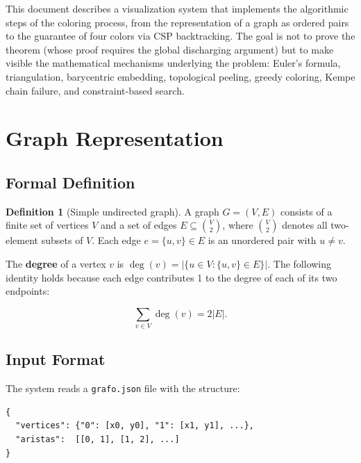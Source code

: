 \documentclass[12pt,letterpaper]{article}
\theoremstyle{plain}
\theoremstyle{definition}
\newtheorem{definition}[theorem]{Definition}
\theoremstyle{remark}
\newcommand{\degr}{\operatorname{deg}}
\begin{document}
This document describes a visualization system that implements the algorithmic
steps of the coloring process, from the representation of a graph as ordered
pairs to the guarantee of four colors via CSP backtracking. The goal is not to
prove the theorem (whose proof requires the global discharging argument) but to
make visible the mathematical mechanisms underlying the problem: Euler's formula,
triangulation, barycentric embedding, topological peeling, greedy coloring,
Kempe chain failure, and constraint-based search.

\section{Graph Representation}

\subsection{Formal Definition}

\begin{definition}[Simple undirected graph]
A graph $G = (V, E)$ consists of a finite set of vertices $V$ and a set of edges
$E \subseteq \binom{V}{2}$, where $\binom{V}{2}$ denotes all two-element subsets
of $V$. Each edge $e = \{u,v\} \in E$ is an unordered pair with $u \neq v$.
\end{definition}

The \textbf{degree} of a vertex $v$ is $\degr(v) = |\{u \in V : \{u,v\} \in E\}|$.
The following identity holds because each edge contributes 1 to the degree of
each of its two endpoints:

\begin{equation}
    \sum_{v \in V} \degr(v) = 2|E|.
    \label{eq:handshake}
\end{equation}

\subsection{Input Format}

The system reads a \texttt{grafo.json} file with the structure:

\begin{lstlisting}[caption={Input file structure},label={lst:json}]
{
  "vertices": {"0": [x0, y0], "1": [x1, y1], ...},
  "aristas":  [[0, 1], [1, 2], ...]
}
\end{lstlisting}
\end{document}
